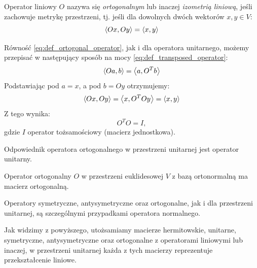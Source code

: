 \begin{definition}\label{def:ortogonal_operator}
    Operator liniowy $O$ nazywa się \textit{ortogonalnym} lub inaczej \textit{izometrią liniową}, jeśli zachowuje metrykę przestrzeni, tj. jeśli dla dowolnych dwóch wektorów $x, y \in V$:
    \begin{equation}\label{eq:def_ortogonal_operator}
        \left\langle Ox, Oy \right\rangle = \left\langle x, y \right\rangle
    \end{equation}
\end{definition}
Równość \eqref{eq:def_ortogonal_operator}, jak i dla operatora unitarnego, możemy przepisać w następujący sposób na mocy \eqref{eq:def_transposed_operator}:
$$\left\langle Oa, b \right\rangle = \left\langle a, O^Tb \right\rangle$$
Podstawiając pod $a = x$, a pod $b = Oy$ otrzymujemy:
$$\left\langle Ox, Oy \right\rangle = \left\langle x, O^TOy \right\rangle = \left\langle x, y \right\rangle$$
Z tego wynika:
\begin{equation}\label{eq:def_ortogonal_operator_2}
    O^TO = I,
\end{equation} gdzie $I$ operator tożsamościowy (macierz jednostkowa). 
\begin{remark}
Odpowiednik operatora ortogonalnego w przestrzeni unitarnej jest operator unitarny.
\end{remark}
\begin{theorem}
    Operator ortogonalny $O$ w przestrzeni euklidesowej $V$ z bazą ortonormalną ma macierz ortogonalną.
\end{theorem}

Operatory symetryczne, antysymetryczne oraz ortogonalne, jak i dla przestrzeni unitarnej, są szczególnymi przypadkami operatora normalnego.

Jak widzimy z powyższego, utożsamiamy macierze hermitowskie, unitarne, symetryczne, antysymetryczne oraz ortogonalne z operatorami liniowymi lub inaczej, w przestrzeni unitarnej każda z tych macierzy reprezentuje przekształcenie liniowe.
